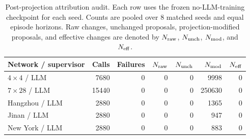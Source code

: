 \documentclass[10pt]{article}
\begin{document}
\begin{table}[htbp]
\centering\small
\caption{Post-projection attribution audit. Each row uses the frozen no-LLM-training checkpoint for each seed. Counts are
pooled over 8 matched seeds and equal episode horizons. Raw changes,
unchanged proposals, projection-modified proposals, and effective changes are
denoted by $N_{\rm raw}$, $N_{\rm unch}$, $N_{\rm mod}$, and $N_{\rm eff}$.}
\label{tab:execution_audit}
\begin{tabularx}{\linewidth}{@{}Xrrrrrr@{}}
\toprule
Network / supervisor & Calls & Failures & $N_{\rm raw}$ & $N_{\rm unch}$ & $N_{\rm mod}$ & $N_{\rm eff}$\\
\midrule
$4\times4$ / LLM & 7680 & 0 & 0 & 0 & 9998 & 0\\
$7\times28$ / LLM & 15440 & 0 & 0 & 0 & 250630 & 0\\
Hangzhou / LLM & 2880 & 0 & 0 & 0 & 1365 & 0\\
Jinan / LLM & 2880 & 0 & 0 & 0 & 947 & 0\\
New York / LLM & 2880 & 0 & 0 & 0 & 883 & 0\\
\bottomrule
\end{tabularx}
\end{table}
\end{document}
